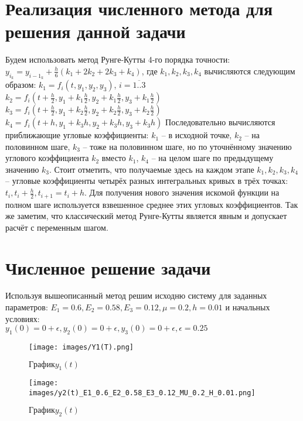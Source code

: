 \documentclass[a4paper,12pt,titlepage,finall]{article}
\begin{document}
\begin{itemize}
\section{Реализация численного метода для решения данной задачи}
Будем использовать метод Рунге-Кутты 4-го порядка точности: \newline
$y_i_k = y_{i-1}_k + \frac{h}{6}(k_1 + 2k_2 + 2k_3 + k_4)$, где $k_1, k_2, k_3, k_4$ \newline 
вычисляются следующим образом: \newline
$k_1 = f_i(t, y_1, y_2, y_3)$,   $i = \overline{1..3}$ \newline
$k_2 = f_i(t +\frac{h}{2}, y_1 + k_1 \frac{h}{2}, y_2 + k_1 \frac{h}{2}, y_3 + k_1 \frac{h}{2})$ \newline
$k_3 =f_i(t +\frac{h}{2}, y_1 + k_2\frac{h}{2}, y_2 + k_2 \frac{h}{2}, y_3 + k_2 \frac{h}{2})$ \newline
$k_4 =f_i(t +h, y_1 + k_3 h, y_2 + k_3 h, y_3 + k_3 h)$ \newline
Последовательно вычисляются приближающие угловые коэффициенты: $k_1$ – в исходной точке, $k_2$ – на половинном шаге, $k_3$ – тоже на половинном шаге, но по уточнённому значению углового коэффициента $k_2$ вместо $k_1$, $k_4$ – на целом шаге по предыдущему значению $k_3$. Стоит отметить, что получаемые здесь на каждом этапе $k_1, k_2, k_3, k_4$ – угловые коэффициенты четырёх разных интегральных кривых в трёх точках: $t_i, t_i + \frac{h}{2}, t_{i+1} = t_i + h$. Для получения
нового значения искомой функции на полном шаге используется взвешенное среднее этих
угловых коэффициентов. Так же заметим, что классический метод Рунге-Кутты является явным и допускает расчёт с переменным шагом.
\newpage
\section{Численное решение задачи}
Используя вышеописанный метод решим исходню систему для заданных параметров:
$E_1 = 0.6, E_2 = 0.58, E_3 = 0.12, \mu = 0.2, h = 0.01$ и начальных условиях: \\
$y_1(0) = 0 + \epsilon, y_2(0) = 0 + \epsilon, y_3(0)= 0 + \epsilon, \epsilon = 0.25$


\begin{figure}[h]
    \centering
    \texttt{[image: images/Y1(T).png]}
    \caption{$График y_1(t)$}
    \label{fig:my_label}
\end{figure} 


\begin{figure}[h]
    \centering
    \texttt{[image: images/y2(t)\_E1\_0.6\_E2\_0.58\_E3\_0.12\_MU\_0.2\_H\_0.01.png]}
    \caption{$График y_2(t)$}
    \label{fig:my_label}
\end{figure}


\end{itemize}
\end{document}
